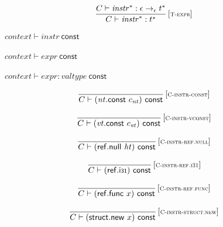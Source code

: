 \vspace{1ex}

$$
\begin{array}{@{}c@{}}\displaystyle
\frac{
C \vdash {{\mathit{instr}}^\ast} : \epsilon \rightarrow_{\epsilon} {t^\ast}
}{
C \vdash {{\mathit{instr}}^\ast} : {t^\ast}
} \, {[\textsc{\scriptsize T{-}expr}]}
\qquad
\end{array}
$$

\vspace{1ex}

$\boxed{{\mathit{context}} \vdash {\mathit{instr}}~\mathsf{const}}$

$\boxed{{\mathit{context}} \vdash {\mathit{expr}}~\mathsf{const}}$

$\boxed{{\mathit{context}} \vdash {\mathit{expr}} : {\mathit{valtype}}~\mathsf{const}}$

$$
\begin{array}{@{}c@{}}\displaystyle
\frac{
}{
C \vdash ({\mathit{nt}}{.}\mathsf{const}~c_{\mathit{nt}})~\mathsf{const}
} \, {[\textsc{\scriptsize C{-}instr{-}const}]}
\qquad
\end{array}
$$

$$
\begin{array}{@{}c@{}}\displaystyle
\frac{
}{
C \vdash ({\mathit{vt}}{.}\mathsf{const}~c_{\mathit{vt}})~\mathsf{const}
} \, {[\textsc{\scriptsize C{-}instr{-}vconst}]}
\qquad
\end{array}
$$

$$
\begin{array}{@{}c@{}}\displaystyle
\frac{
}{
C \vdash (\mathsf{ref{.}null}~{\mathit{ht}})~\mathsf{const}
} \, {[\textsc{\scriptsize C{-}instr{-}ref.null}]}
\qquad
\end{array}
$$

$$
\begin{array}{@{}c@{}}\displaystyle
\frac{
}{
C \vdash (\mathsf{ref{.}i{\scriptstyle 31}})~\mathsf{const}
} \, {[\textsc{\scriptsize C{-}instr{-}ref.i31}]}
\qquad
\end{array}
$$

$$
\begin{array}{@{}c@{}}\displaystyle
\frac{
}{
C \vdash (\mathsf{ref{.}func}~x)~\mathsf{const}
} \, {[\textsc{\scriptsize C{-}instr{-}ref.func}]}
\qquad
\end{array}
$$

$$
\begin{array}{@{}c@{}}\displaystyle
\frac{
}{
C \vdash (\mathsf{struct{.}new}~x)~\mathsf{const}
} \, {[\textsc{\scriptsize C{-}instr{-}struct.new}]}
\qquad
\end{array}
$$

